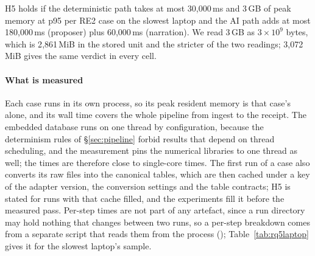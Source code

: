 H5 holds if the deterministic path takes at most 30{,}000\,ms and 3\,GB of peak memory at p95 per RE2 case on the slowest laptop and the AI path adds at most 180{,}000\,ms (proposer) plus 60{,}000\,ms (narration).
We read 3\,GB as $3 \times 10^9$ bytes, which is 2{,}861\,MiB in the stored unit and the stricter of the two readings; 3{,}072\,MiB gives the same verdict in every cell.

\paragraph{What is measured}
Each case runs in its own process, so its peak resident memory is that case's alone, and its wall time covers the whole pipeline from ingest to the receipt.
The embedded database runs on one thread by configuration, because the determinism rules of \S\ref{sec:pipeline} forbid results that depend on thread scheduling, and the measurement pins the numerical libraries to one thread as well; the times are therefore close to single-core times.
The first run of a case also converts its raw files into the canonical tables, which are then cached under a key of the adapter version, the conversion settings and the table contracts; H5 is stated for runs with that cache filled, and the experiments fill it before the measured pass.
Per-step times are not part of any artefact, since a run directory may hold nothing that changes between two runs, so a per-step breakdown comes from a separate script that reads them from the process (); Table~\ref{tab:rq5laptop} gives it for the slowest laptop's sample.

